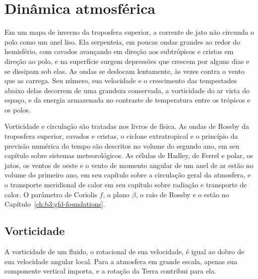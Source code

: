 \chapter{Dinâmica atmosférica}\label{ch:b3:atmospheric-dynamics}

Em um mapa de inverno da troposfera superior, a corrente de jato não circunda o
polo como um anel liso. Ela serpenteia, em poucas ondas grandes ao redor do
hemisfério, com cavados avançando em direção aos subtrópicos e cristas em direção
ao polo, e na superfície surgem depressões que crescem por alguns dias e se
dissipam sob elas. As ondas se deslocam lentamente, às vezes contra o vento que as
carrega. Seu número, sua velocidade e o crescimento das tempestades abaixo delas
decorrem de uma grandeza conservada, a vorticidade do ar vista do
espaço, e da energia armazenada no contraste de temperatura entre os
trópicos e os polos.

\begin{recall}
Vorticidade e circulação são tratadas nos livros de física. As ondas de Rossby da
troposfera superior, cavados e cristas, o ciclone extratropical e o
princípio da previsão numérica do tempo são descritos no volume do segundo
ano, em seu capítulo sobre sistemas meteorológicos. As células de Hadley, de Ferrel e polar,
os jatos, os ventos de oeste e o vento de momento angular de um anel de
ar estão no volume do primeiro ano, em seu capítulo sobre a circulação geral da
atmosfera, e o transporte meridional de calor em seu capítulo sobre
radiação e transporte de calor. O parâmetro de Coriolis $f$, o plano $\beta$,
o raio de Rossby e o  estão no
Capítulo~\ref{ch:b3:gfd-foundations}.
\end{recall}

\section{Vorticidade}\label{sec:b3:atmospheric-dynamics:vorticity}

A vorticidade de um fluido, o rotacional de sua velocidade, é igual ao dobro de sua
velocidade angular local. Para a atmosfera em grande escala, apenas sua componente
vertical importa, e a rotação da Terra contribui para ela.

